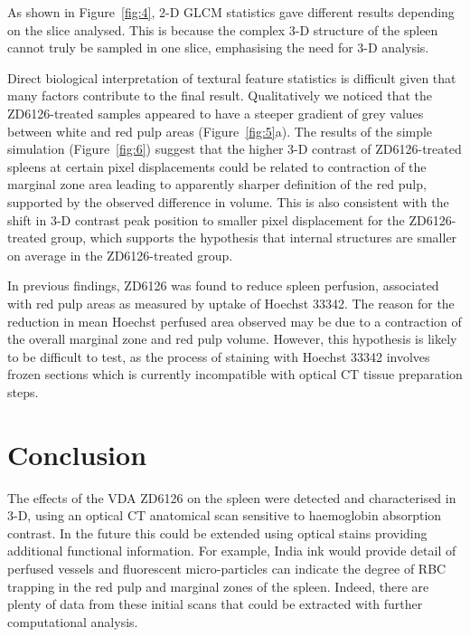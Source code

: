 \documentclass[12pt]{article}
\begin{document}
As shown in Figure~\ref{fig:4}, 2-D GLCM statistics gave different results depending on the slice analysed. This is because the complex 3-D structure of the spleen cannot truly be sampled in one slice, emphasising the need for 3-D analysis. 

Direct biological interpretation of textural feature statistics is difficult given that many factors contribute to the final result. Qualitatively we noticed that the ZD6126-treated samples appeared to have a steeper gradient of grey values between white and red pulp areas (Figure~\ref{fig:5}a). The results of the simple simulation (Figure~\ref{fig:6}) suggest that the higher 3-D contrast of ZD6126-treated spleens at certain pixel displacements could be related to contraction of the marginal zone area leading to apparently sharper definition of the red pulp, supported by the observed difference in volume. This is also consistent with the shift in 3-D contrast peak position to smaller pixel displacement for the ZD6126-treated group, which supports the hypothesis that internal structures are smaller on average in the ZD6126-treated group.

In previous findings, ZD6126 was found to reduce spleen perfusion, associated with red pulp areas as measured by uptake of Hoechst 33342. \cite{cullistumour2006} The reason for the reduction in mean Hoechst perfused area observed may be due to a contraction of the overall marginal zone and red pulp volume. However, this hypothesis is likely to be difficult to test, as the process of staining with Hoechst 33342 involves frozen sections which is currently incompatible with optical CT tissue preparation steps. 

\section{Conclusion} 
The effects of the VDA ZD6126 on the spleen were detected and characterised in 3-D, using an optical CT anatomical scan sensitive to haemoglobin absorption contrast. In the future this could be extended using optical stains providing additional functional information. For example, India ink would provide detail of perfused vessels and fluorescent micro-particles can indicate the degree of RBC trapping in the red pulp and marginal zones of the spleen. Indeed, there are plenty of data from these initial scans that could be extracted with further computational analysis.
\end{document}
